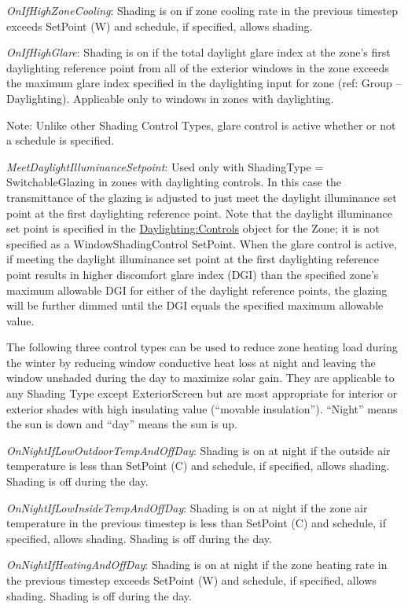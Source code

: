 \emph{OnIfHighZoneCooling}: Shading is on if zone cooling rate in the previous timestep exceeds SetPoint (W) and schedule, if specified, allows shading.

\emph{OnIfHighGlare}: Shading is on if the total daylight glare index at the zone's first daylighting reference point from all of the exterior windows in the zone exceeds the maximum glare index specified in the daylighting input for zone (ref: Group -- Daylighting). Applicable only to windows in zones with daylighting.

Note: Unlike other Shading Control Types, glare control is active whether or not a schedule is specified.

\emph{MeetDaylightIlluminanceSetpoint}: Used only with ShadingType = SwitchableGlazing in zones with daylighting controls. In this case the transmittance of the glazing is adjusted to just meet the daylight illuminance set point at the first daylighting reference point. Note that the daylight illuminance set point is specified in the \hyperref[daylightingcontrols-000]{Daylighting:Controls} object for the Zone; it is not specified as a WindowShadingControl SetPoint. When the glare control is active, if meeting the daylight illuminance set point at the first daylighting reference point results in higher discomfort glare index (DGI) than the specified zone's maximum allowable DGI for either of the daylight reference points, the glazing will be further dimmed until the DGI equals the specified maximum allowable value.

The following three control types can be used to reduce zone heating load during the winter by reducing window conductive heat loss at night and leaving the window unshaded during the day to maximize solar gain. They are applicable to any Shading Type except ExteriorScreen but are most appropriate for interior or exterior shades with high insulating value (``movable insulation''). ``Night'' means the sun is down and ``day'' means the sun is up.

\emph{OnNightIfLowOutdoorTempAndOffDay}: Shading is on at night if the outside air temperature is less than SetPoint (C) and schedule, if specified, allows shading. Shading is off during the day.

\emph{OnNightIfLowInsideTempAndOffDay}: Shading is on at night if the zone air temperature in the previous timestep is less than SetPoint (C) and schedule, if specified, allows shading. Shading is off during the day.

\emph{OnNightIfHeatingAndOffDay}: Shading is on at night if the zone heating rate in the previous timestep exceeds SetPoint (W) and schedule, if specified, allows shading. Shading is off during the day.

